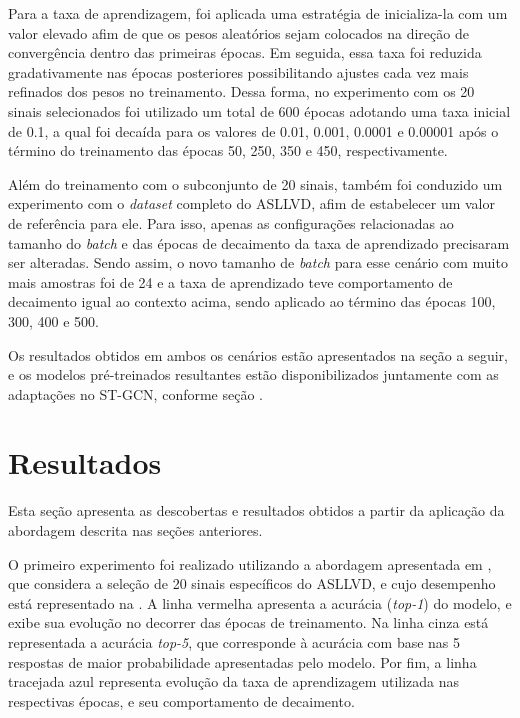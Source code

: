 Para a taxa de aprendizagem, foi aplicada uma estratégia de inicializa-la com um valor elevado afim de que os pesos aleatórios sejam colocados na direção de convergência dentro das primeiras épocas. Em seguida, essa taxa foi reduzida gradativamente nas épocas posteriores possibilitando ajustes cada vez mais refinados dos pesos no treinamento. Dessa forma, no experimento com os 20 sinais selecionados foi utilizado um total de 600 épocas adotando uma taxa inicial de 0.1, a qual foi decaída para os valores de 0.01, 0.001, 0.0001 e 0.00001 após o término do treinamento das épocas 50, 250, 350 e 450, respectivamente.


Além do treinamento com o subconjunto de 20 sinais, também foi conduzido um experimento com o \textit{dataset} completo do ASLLVD, afim de estabelecer um valor de referência para ele. Para isso, apenas as configurações relacionadas ao tamanho do \textit{batch} e das épocas de decaimento da taxa de aprendizado precisaram ser alteradas. Sendo assim, o novo tamanho de \textit{batch} para esse cenário com muito mais amostras foi de 24 e a taxa de aprendizado teve comportamento de decaimento igual ao contexto acima, sendo aplicado ao término das épocas 100, 300, 400 e 500.

Os resultados obtidos em ambos os cenários estão apresentados na seção a seguir, e os modelos pré-treinados resultantes estão disponibilizados juntamente com as adaptações no ST-GCN, conforme seção .


\section{Resultados} %
\label{sec:resultados}

Esta seção apresenta as descobertas e resultados obtidos a partir da aplicação da abordagem descrita nas seções anteriores. 

O primeiro experimento foi realizado utilizando a abordagem apresentada em \cite{lim-2016}, que considera a seleção de 20 sinais específicos do ASLLVD, e cujo desempenho está representado na . A linha vermelha apresenta a acurácia (\textit{top-1}) do modelo, e exibe sua evolução no decorrer das épocas de treinamento. Na linha cinza está representada a acurácia \textit{top-5}, que corresponde à acurácia com base nas 5 respostas de maior probabilidade apresentadas pelo modelo. Por fim, a linha tracejada azul representa evolução da taxa de aprendizagem utilizada nas respectivas épocas, e seu comportamento de decaimento.

